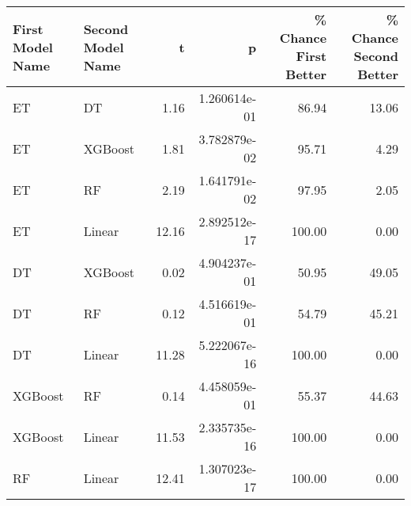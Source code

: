 \begin{tabular}{llrrrr}
\toprule
First Model Name & Second Model Name &     t &            p &  \% Chance First Better &  \% Chance Second Better \\
\midrule
              ET &                DT &  1.16 & 1.260614e-01 &                  86.94 &                   13.06 \\
              ET &           XGBoost &  1.81 & 3.782879e-02 &                  95.71 &                    4.29 \\
              ET &                RF &  2.19 & 1.641791e-02 &                  97.95 &                    2.05 \\
              ET &            Linear & 12.16 & 2.892512e-17 &                 100.00 &                    0.00 \\
              DT &           XGBoost &  0.02 & 4.904237e-01 &                  50.95 &                   49.05 \\
              DT &                RF &  0.12 & 4.516619e-01 &                  54.79 &                   45.21 \\
              DT &            Linear & 11.28 & 5.222067e-16 &                 100.00 &                    0.00 \\
         XGBoost &                RF &  0.14 & 4.458059e-01 &                  55.37 &                   44.63 \\
         XGBoost &            Linear & 11.53 & 2.335735e-16 &                 100.00 &                    0.00 \\
              RF &            Linear & 12.41 & 1.307023e-17 &                 100.00 &                    0.00 \\
\bottomrule
\end{tabular}
